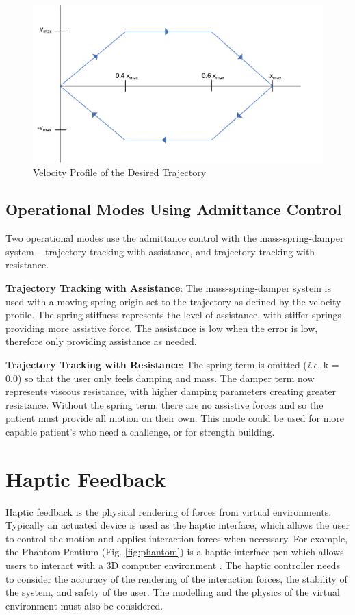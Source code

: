 \documentclass[12pt]{report}
\begin{document}
	\begin{figure}[h] 
		\centering
		\includegraphics[width=0.75\linewidth]{velocity_profile}
		\caption{Velocity Profile of the Desired Trajectory}
		\label{fig:velocity_profile}
	\end{figure}
	
	
	
	\subsection{Operational Modes Using Admittance Control}
	
	Two operational modes use the admittance control with the mass-spring-damper system -- trajectory tracking with assistance, and trajectory tracking with resistance. 
	
	\textbf{Trajectory Tracking with Assistance}: The mass-spring-damper system is used with a moving spring origin set to the trajectory as defined by the velocity profile. The spring stiffness represents the level of assistance, with stiffer springs providing more assistive force. The assistance is low when the error is low, therefore only providing assistance as needed. 
	
	\textbf{Trajectory Tracking with Resistance}: The spring term is omitted (\textit{i.e.} k = 0.0) so that the user only feels damping and mass. The damper term now represents viscous resistance, with higher damping parameters creating greater resistance. Without the spring term, there are no assistive forces and so the patient must provide all motion on their own. This mode could be used for more capable patient's who need a challenge, or for strength building. 
	
	

	\section{Haptic Feedback} \label{sec:haptic}
	
	
	Haptic feedback is the physical rendering of forces from virtual environments. Typically an actuated device is used as the haptic interface, which allows the user to control the motion and applies interaction forces when necessary. For example, the Phantom Pentium (Fig. \ref{fig:phantom}) is a haptic interface pen which allows users to interact with a 3D computer environment \cite{Massie1994}. The haptic controller needs to consider the accuracy of the rendering of the interaction forces, the stability of the system, and safety of the user. The modelling and the physics of the virtual environment must also be considered. 		
		
\end{document}
